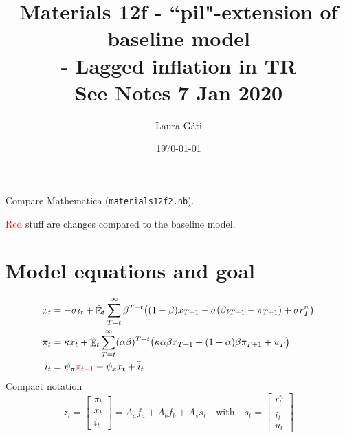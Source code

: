 \documentclass[11pt]{article}
\renewcommand{\[}{\begin{equation}}
\renewcommand{\]}{\end{equation}}
\DeclareMathOperator{\E}{\mathbb{E}}
\begin{document}
\linespread{1.0}

\title{Materials 12f - ``pil"-extension of baseline model\\
- Lagged inflation in TR
\\
\small{See Notes 7 Jan 2020}}
\author{Laura G\'ati} 
\date{\today}
\maketitle




Compare Mathematica (\texttt{materials12f2.nb}).

\textcolor{red}{Red} stuff are changes compared to the baseline model.
\section{Model equations and goal}
\begin{align}
x_t &=  -\sigma i_t +\hat{\E}_t \sum_{T=t}^{\infty} \beta^{T-t }\big( (1-\beta)x_{T+1} - \sigma(\beta i_{T+1} - \pi_{T+1}) +\sigma r_T^n \big)  \label{prestons18}  \\
\pi_t &= \kappa x_t +\hat{\E}_t \sum_{T=t}^{\infty} (\alpha\beta)^{T-t }\big( \kappa \alpha \beta x_{T+1} + (1-\alpha)\beta \pi_{T+1} + u_T\big) \label{prestons19}  \\
i_t &= \psi_{\pi}\textcolor{red}{\pi_{t-1}}+ \psi_{x} x_t  + \bar{i}_t \label{TR}
\end{align}
Compact notation
\begin{equation}
z_t = \begin{bmatrix} \pi_t \\ x_t \\ i_t \end{bmatrix} = A_a f_{a} + A_b f_{b} + A_s s_t \quad \text{with} \quad  s_t = \begin{bmatrix} r_t^n \\ \bar{i}_t \\ u_t \end{bmatrix}
\end{equation}
\end{document}
